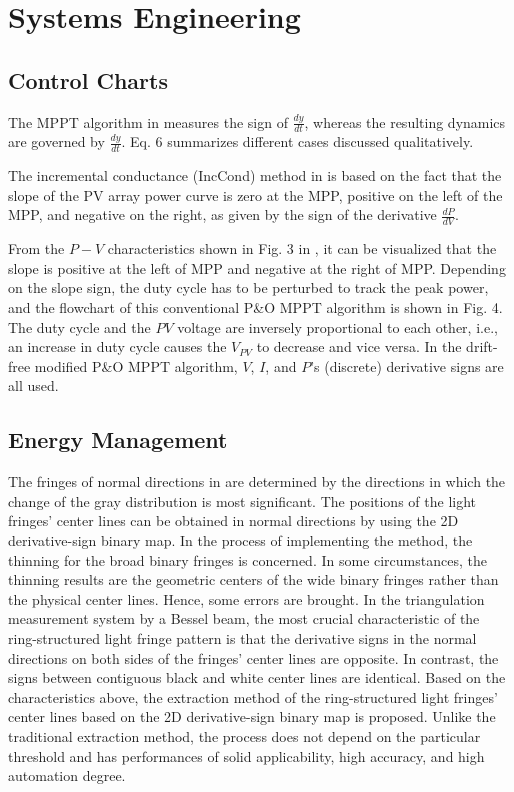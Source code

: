 \documentclass[11pt]{book}
\begin{document}
\section{Systems Engineering}


\subsection{Control Charts}

The MPPT algorithm in \cite{leyva2006mppt} measures the sign of $\frac{dy}{dt}$,
whereas the resulting dynamics are governed by $\frac{dy}{dt}$. Eq.
6 summarizes different cases discussed qualitatively.

The incremental conductance (IncCond) method in \cite{esram2007comparison}
is based on the fact that the slope of the PV array power curve is
zero at the MPP, positive on the left of the MPP, and negative on
the right, as given by the sign of the derivative $\frac{dP}{dV}$.

From the $P-V$ characteristics shown in Fig. 3 in \cite{killi2015modified},
it can be visualized that the slope is positive at the left of MPP
and negative at the right of MPP. Depending on the slope sign, the
duty cycle has to be perturbed to track the peak power, and the flowchart
of this conventional P\&O MPPT algorithm is shown in Fig. 4. The duty
cycle and the $PV$ voltage are inversely proportional to each other,
i.e., an increase in duty cycle causes the $V_{PV}$ to decrease and
vice versa. In the drift-free modified P\&O MPPT algorithm, $V$,
$I$, and $P$'s (discrete) derivative signs are all used.


\subsection{Energy Management}

The fringes of normal directions in \cite{wang2009method} are determined
by the directions in which the change of the gray distribution is
most significant. The positions of the light fringes' center lines
can be obtained in normal directions by using the 2D derivative-sign
binary map. In the process of implementing the method, the thinning
for the broad binary fringes is concerned. In some circumstances,
the thinning results are the geometric centers of the wide binary
fringes rather than the physical center lines. Hence, some errors
are brought. In the triangulation measurement system by a Bessel beam,
the most crucial characteristic of the ring-structured light fringe
pattern is that the derivative signs in the normal directions on both
sides of the fringes' center lines are opposite. In contrast, the
signs between contiguous black and white center lines are identical.
Based on the characteristics above, the extraction method of the ring-structured
light fringes' center lines based on the 2D derivative-sign binary
map is proposed. Unlike the traditional extraction method, the process
does not depend on the particular threshold and has performances of
solid applicability, high accuracy, and high automation degree.
\end{document}

